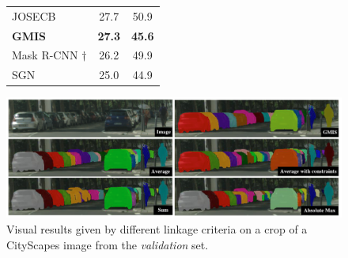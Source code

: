 \begin{figure}[t]
\begin{minipage}[t]{0.49\textwidth}
\begin{tabular}[t]{l|cc}
       JOSECB \cite{neven2019instance} & 27.7 & 50.9 \\
       \textbf{GMIS} \cite{liu2018affinity} & \textbf{27.3} & \textbf{45.6} \\
       Mask R-CNN \cite{he2017mask} $\dagger$ & 26.2 & 49.9 \\
       SGN \cite{liu2017sgn} & 25.0 & 44.9 \\
    \end{tabular}
\label{tab:results_cityscapes}
\label{tab:results_cityscapes_test}
\end{minipage}
\end{figure}
\begin{figure}[t]
\centering
\begin{minipage}{\textwidth}
\centering
\includegraphics[width=\textwidth]{./figs/cityscapes_compare_6.pdf} %
\caption{Visual results given by different \algname{} linkage criteria on a crop of a CityScapes image from the \emph{validation} set.}\label{fig:cityscapes}
\end{minipage}
\end{figure}


